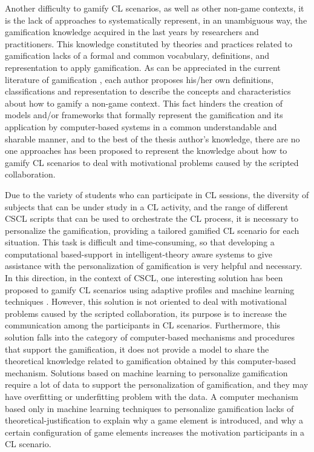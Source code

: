 Another difficulty to gamify CL scenarios, as well as other non-game contexts, it is the lack of approaches to systematically represent, in an unambiguous way, the gamification knowledge acquired in the last years by researchers and practitioners. This knowledge constituted by theories and practices related to gamification lacks of a formal and common vocabulary, definitions, and representation to apply gamification. As can be appreciated in the current literature of gamification \cite{DichevaDichevAgreAngelova2015, HamariKoivistoSarsa2014, MoraRieraGonzalezArnedo-Moreno2015, SeabornFels2015}, each author proposes his/her own definitions, classifications and representation to describe the concepts and characteristics about how to gamify a non-game context. This fact hinders the creation of models and/or frameworks that formally represent the gamification and its application by computer-based systems in a common understandable and sharable manner, and to the best of the thesis author’s knowledge, there are no one approaches has been proposed to represent the knowledge about how to gamify CL scenarios to deal with motivational problems caused by the scripted collaboration.

Due to the variety of students who can participate in CL sessions, the diversity of subjects that can be under study in a CL activity, and the range of different CSCL scripts that can be used to orchestrate the CL process, it is necessary to personalize the gamification, providing a tailored gamified CL scenario for each situation. This task is difficult and time-consuming, so that developing a computational based-support in intelligent-theory aware systems to give assistance with the personalization of gamification is very helpful and necessary. In this direction, in the context of CSCL, one interesting solution has been proposed to gamify CL scenarios using adaptive profiles and machine learning techniques \cite{KnutasIkonenMaggioriniRipamontiPorras2014,KnutasIkonenNikulaPorras2014}. However, this solution is not oriented to deal with motivational problems caused by the scripted collaboration, its purpose is to increase the communication among the participants in CL scenarios. Furthermore, this solution falls into the category of computer-based mechanisms and procedures that support the gamification, it does not provide a model to share the theoretical knowledge related to gamification obtained by this computer-based mechanism. Solutions based on machine learning to personalize gamification require a lot of data to support the personalization of gamification, and they may have overfitting or underfitting problem with the data. A computer mechanism based only in machine learning techniques to personalize gamification lacks of theoretical-justification to explain why a game element is introduced, and why a certain configuration of game elements increases the motivation participants in a CL scenario.

